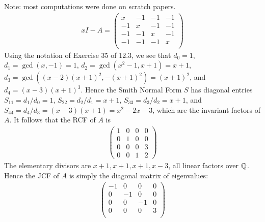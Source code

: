 \documentclass[12pt]{article}
\begin{document}
\begin{problem}[6]
Note: most computations were done on scratch papers.
\begin{align*}
	xI - A = \begin{pmatrix} x&-1&-1&-1\\-1&x&-1&-1\\-1&-1&x&-1\\-1&-1&-1&x\\ \end{pmatrix} 
\end{align*}
Using the notation of Exercise 35 of 12.3, we see that $ d_0 = 1$, $ d_1 = \gcd ( x,-1)=1 $, $ d_2 = \gcd ( x^2-1,x+1) = x+1 $, $ d_3= \gcd (( x-2)(x+1)^2,-(x+1)^2 ) = (x+1)^2$, and $ d_4 = (x-3)(x+1)^3$. Hence the Smith Normal Form $ S$ has diagonal entries  $ S_{11} = d_1 / d_0 = 1$, $ S_{22} = d_2 / d_1 = x+1$, $ S_{33} = d_3 /d_2 = x+1$, and $ S_{44} = d_4 / d_3 = (x-3)(x+1) = x^2-2x-3$, which are the invariant factors of $ A$. It follows that the RCF of $ A$ is 
\begin{align*}
	\begin{pmatrix} 1&0&0&0\\0&1&0&0\\0&0&0&3\\0&0&1&2 \end{pmatrix} 
\end{align*}
The elementary divisors are $ x+1,x+1,x+1,x-3$, all linear factors over  $ \mathbb{Q}$. Hence the JCF of $ A$ is simply the diagonal matrix of eigenvalues:
 \begin{align*}
	 \begin{pmatrix} -1&0&0&0\\0&-1&0&0\\0&0&-1&0\\0&0&0&3\\ \end{pmatrix} 
\end{align*}

\end{problem}
\end{document}
